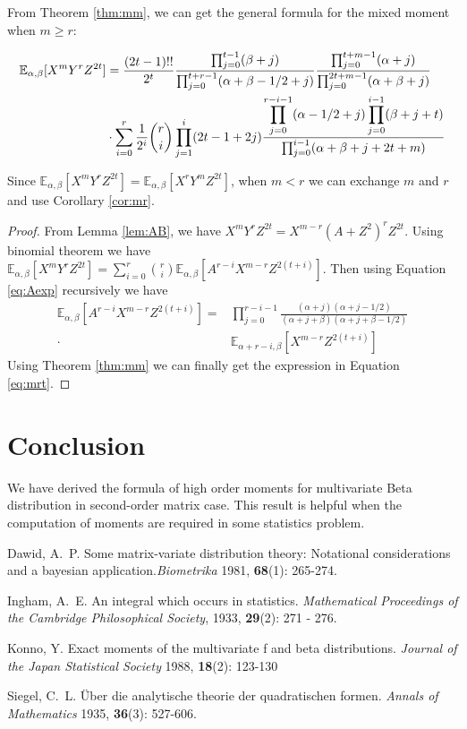 \documentclass[twoside]{article}%
\def\E{\mathbb{E}}
\begin{document}
From Theorem \ref{thm:mm},
we can get
the general formula for the mixed moment when $m\geq r$:
\begin{corollary}\label{cor:mr}
\begin{align}
\E_{\alpha, \beta}[X^mY^rZ^{2t}] &= \frac{(2t-1)!!}{2^t}
\frac{\prod_{j=0}^{t-1} (\beta+j)}{\prod_{j=0}^{t+r-1} (\alpha+\beta-1/2+j)}
\frac{\prod_{j=0}^{t+m-1}(\alpha+j)}{\prod_{j=0}^{2t+m-1} (\alpha+\beta+j)}\notag\\
&\cdot\sum_{i=0}^r \frac{1}{2^i}\binom{r}{i}\prod_{j=1}^i (2t-1+2j)
\frac{\displaystyle\prod_{j=0}^{r-i-1}(\alpha-1/2+j)
\prod_{j=0}^{i-1}(\beta+j+t)}{\prod_{j=0}^{i-1}(\alpha+\beta+j+2t+m)}
\label{eq:mrt}
\end{align}
\end{corollary}
Since $\E_{\alpha, \beta}[X^mY^rZ^{2t}]=\E_{\alpha, \beta}[X^rY^mZ^{2t}]$, 
when $m<r$ we can exchange $m$ and $r$ and use Corollary \ref{cor:mr}.
\begin{proof}
From Lemma \ref{lem:AB}, we have
$X^m Y^r Z^{2t} = X^{m-r}(A+Z^2)^r Z^{2t} $.
Using binomial theorem we have
$\E_{\alpha, \beta}[X^m Y^r Z^{2t}] = \sum_{i=0}^r \binom{r}{i}\E_{\alpha, \beta}
[A^{r-i}X^{m-r}Z^{2(t+i)}]$. Then using Equation \eqref{eq:Aexp} recursively
we have 
\begin{align*}
\E_{\alpha, \beta}
[A^{r-i}X^{m-r}Z^{2(t+i)}] =&
\prod_{j=0}^{r-i-1}\frac{(\alpha+j)(\alpha+j-1/2)}
{(\alpha+j+\beta)(\alpha+j+\beta-1/2)} \\
\cdot & \E_{\alpha+r-i, \beta}
[X^{m-r}Z^{2(t+i)}]
\end{align*}
Using Theorem \ref{thm:mm} we can finally get the expression in
Equation \eqref{eq:mrt}.
\end{proof}
\section{Conclusion}
We have derived the formula of high order moments for multivariate Beta distribution
in second-order matrix case. This result is helpful when the computation of moments
are required in some statistics problem.

\begin{thebibliography}{stringX}
\leftskip=-8mm
\parskip=-1mm
\small

 Dawid, A.~P. Some matrix-variate distribution theory: Notational
  considerations and a bayesian application.{\it Biometrika} 1981, {\bf 68}(1): 265-274.

 Ingham, A.~E. An integral which occurs in statistics. {\it Mathematical
  Proceedings of the Cambridge Philosophical Society}, 1933, {\bf 29}(2): 271 - 276.   %

 Konno, Y. Exact moments of the multivariate f and beta distributions.
{\it Journal of the Japan Statistical Society} 1988, {\bf 18}(2): 123-130

 Siegel, C.~L. Über die analytische theorie der quadratischen formen.
  {\it Annals of Mathematics} 1935, {\bf 36}(3): 527-606.

\end{thebibliography}

\end{document}
